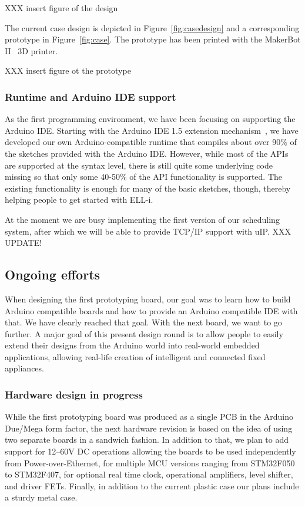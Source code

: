 \documentclass[draft,a4paper]{siamltex}
\begin{document}
XXX insert figure of the design

The current case design is depicted in Figure~\ref{fig:casedesign} and
a corresponding prototype in Figure~\ref{fig:case}.  The prototype has
been printed with the MakerBot II~\cite{MakerBotII} 3D printer.

XXX insert figure ot the prototype

\subsubsection{Runtime and Arduino IDE support}

As the first programming environment, we have been focusing on
supporting the Arduino IDE.  Starting with the Arduino IDE 1.5
extension mechanism~\cite{ArduinoIDEextension}, we have developed our
own Arduino-compatible runtime that compiles about over 90\% of the
sketches provided with the Arduino IDE.  However, while most of the
APIs are supported at the syntax level, there is still quite some
underlying code missing so that only some 40-50\% of the API
functionality is supported.  The existing functionality is enough for
many of the basic sketches, though, thereby helping people to get
started with ELL-i.

At the moment we are busy implementing the first version of our
scheduling system, after which we will be able to provide TCP/IP
support with uIP.  XXX UPDATE!

\subsection{Ongoing efforts}

When designing the first prototyping board, our goal was to learn how
to build Arduino compatible boards and how to provide an Arduino
compatible IDE with that.  We have clearly reached that goal.  With
the next board, we want to go further.  A major goal of this present
design round is to allow people to easily extend their designs from
the Arduino world into real-world embedded applications, allowing
real-life creation of intelligent and connected fixed appliances.

\subsubsection{Hardware design in progress}

While the first prototyping board was produced as a single PCB in the
Arduino Due/Mega form factor, the next hardware revision is based on
the idea of using two separate boards in a sandwich fashion.  In
addition to that, we plan to add support for 12--60V DC operations allowing
the boards to be used independently from Power-over-Ethernet, for
multiple MCU versions ranging from STM32F050 to STM32F407, for
optional real time clock, operational amplifiers, level shifter, and
driver FETs.  Finally, in addition to the current plastic case our
plans include a sturdy metal case.
\end{document}
